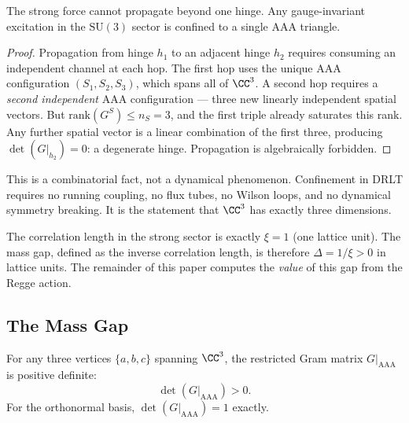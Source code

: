 \begin{proposition}[Confinement]
\label{prop:confinement}
The strong force cannot propagate beyond one hinge. Any gauge-invariant
excitation in the $\mathrm{SU}(3)$ sector is confined to a single AAA
triangle.
\end{proposition}

\begin{proof}
Propagation from hinge $h_1$ to an adjacent hinge $h_2$ requires
consuming an independent channel at each hop. The first hop uses the
unique AAA configuration $(S_1, S_2, S_3)$, which spans all of
$\CC^3$. A second hop requires a \emph{second independent} AAA
configuration --- three new linearly independent spatial vectors. But
$\mathrm{rank}(G^S) \leq n_S = 3$, and the first triple already
saturates this rank. Any further spatial vector is a linear combination
of the first three, producing $\det(G|_{h_2}) = 0$: a degenerate hinge.
Propagation is algebraically forbidden.
\end{proof}

\begin{remark}
This is a combinatorial fact, not a dynamical phenomenon. Confinement
in DRLT requires no running coupling, no flux tubes, no Wilson loops,
and no dynamical symmetry breaking. It is the statement that
$\CC^3$ has exactly three dimensions.
\end{remark}

\begin{remark}
The correlation length in the strong sector is exactly $\xi = 1$ (one
lattice unit). The mass gap, defined as the inverse correlation length,
is therefore $\Delta = 1/\xi > 0$ in lattice units. The remainder of
this paper computes the \emph{value} of this gap from the Regge action.
\end{remark}

\subsection{The Mass Gap}
\label{sec:massgap}

\begin{lemma}
\label{lem:det}
For any three vertices $\{a, b, c\}$ spanning $\CC^3$, the
restricted Gram matrix $G|_{\mathrm{AAA}}$ is positive definite:
\begin{equation}
\det(G|_{\mathrm{AAA}}) > 0.
\end{equation}
For the orthonormal basis, $\det(G|_{\mathrm{AAA}}) = 1$ exactly.
\end{lemma}

